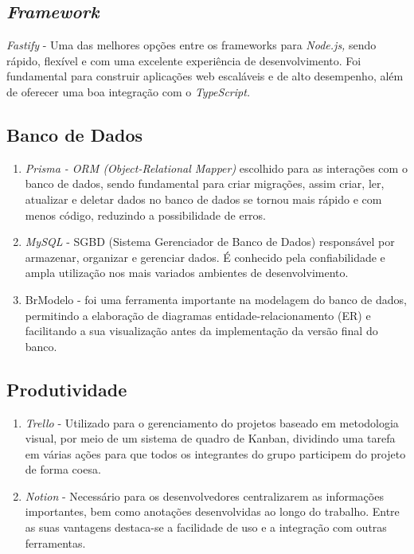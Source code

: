 \subsection{\textit{Framework}}
\textit{Fastify} - Uma das melhores opções entre os frameworks para \textit{Node.js,} sendo rápido, flexível e com uma excelente experiência de desenvolvimento. Foi fundamental para construir aplicações web escaláveis e de alto desempenho, além de oferecer uma boa integração com o \textit{TypeScript.}

\subsection{Banco de Dados}

\begin{enumerate}

	\item \textit{Prisma - ORM (Object-Relational Mapper)} escolhido para as interações com o banco de dados, sendo fundamental para criar migrações, assim criar, ler, atualizar e deletar dados no banco de dados se tornou mais rápido e com menos código, reduzindo a possibilidade de erros.
	
	\item  \textit{MySQL} - SGBD (Sistema Gerenciador de Banco de Dados) responsável por armazenar, organizar e gerenciar dados. É conhecido pela confiabilidade e ampla utilização nos mais variados ambientes de desenvolvimento.
	
	\item BrModelo -  foi uma ferramenta importante na modelagem do banco de dados, permitindo a elaboração de diagramas entidade-relacionamento (ER) e facilitando a sua visualização antes da implementação da versão final do banco.
	
\end{enumerate}

\subsection{Produtividade}

\begin{enumerate}
	
	\item \textit{Trello} - Utilizado para o gerenciamento do projetos baseado em metodologia visual, por meio de um sistema de quadro de Kanban, dividindo uma tarefa em várias ações para que todos os integrantes do grupo participem do projeto de forma coesa.
	
	
	
	\item \textit{ Notion} -  Necessário para os desenvolvedores centralizarem as informações importantes, bem como anotações desenvolvidas ao longo do trabalho. Entre as suas vantagens destaca-se a facilidade de uso e a integração com outras ferramentas.
	
\end{enumerate}

